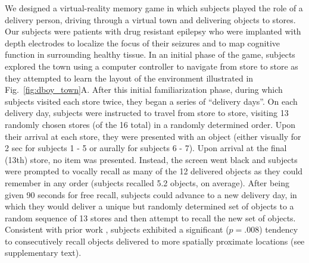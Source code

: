 We designed a virtual-reality memory game in which subjects played the role of a delivery person, driving through a virtual town and delivering objects to stores.  Our subjects were patients with drug resistant epilepsy who were implanted with depth electrodes to localize the focus of their seizures and to map cognitive function in surrounding healthy tissue. In an initial phase of the game, subjects explored the town using a computer controller to navigate from store to store as they attempted to learn the layout of the environment illustrated in Fig.~\ref{fig:dboy_town}A.  After this initial familiarization phase, during which subjects visited each store twice, they began a series of ``delivery days''.  On each delivery day, subjects were instructed to travel from store to store, visiting 13 randomly chosen stores (of the 16 total) in a randomly determined order.  Upon their arrival at each store, they were presented with an object (either visually for 2 sec for subjects 1 - 5 or aurally for subjects 6 - 7).  Upon arrival at the final (13th) store, no item was presented. Instead, the screen went black and subjects were prompted to vocally recall as many of the 12 delivered objects as they could remember in any order (subjects recalled 5.2 objects, on average).  After being given 90 seconds for free recall, subjects could advance to a new delivery day, in which they would deliver a unique but randomly determined set of objects to a random sequence of 13 stores and then attempt to recall the new set of objects. Consistent with prior work \cite{MillEtal12a}, subjects exhibited a significant ($p=.008$) tendency to consecutively recall objects delivered to more spatially proximate locations (see supplementary  text).

